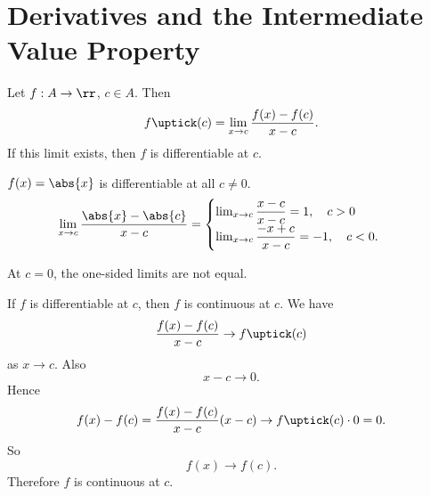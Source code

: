 
\section{Derivatives and the Intermediate Value Property}


\begin{definition}[Derivative]
    Let $f: A\to\rr$, $c\in A$.
    Then
    \[
        f\uptick(c) = \lim_{x\to c} \dfrac{f(x) - f(c)}{x - c}.
    \]
    If this limit exists, then $f$ is differentiable at $c$.
\end{definition}

\begin{problem}{
    $f(x) = \abs{x}$ is differentiable at all $c\neq 0$.
}
    \begin{align*}
        \lim_{x\to c} \dfrac{\abs{x} - \abs{c}}{x-c}
        &= \begin{cases}
               \lim_{x\to c} \dfrac{x - c}{x-c} = 1,\quad c > 0\\
               \lim_{x\to c}\dfrac{-x + c}{x-c} = -1,\quad c < 0.
        \end{cases}
    \end{align*}

    At $c = 0$, the one-sided limits are not equal.
\end{problem}

\begin{proposition}{
    If $f$ is differentiable at $c$, then $f$ is continuous at $c$.
}
    We have
    \[
        \dfrac{f(x) - f(c)}{x-c}\to f\uptick(c)
    \]
    as $x\to c$.
    Also
    \[
        x-c\to 0.
    \]
    Hence
    \[
        f(x) - f(c) = \dfrac{f(x)-f(c)}{x-c}(x-c)\to f\uptick(c)\cdot 0 = 0.
    \]
    So
    \[
        f(x)\to f(c).
    \]
    Therefore $f$ is continuous at $c$.
\end{proposition}

